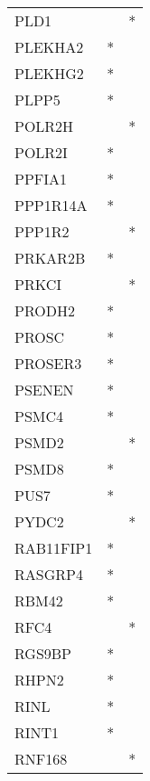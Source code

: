 \begin{longtable}{lcc}
PLD1             &                &          * \\
PLEKHA2          &              * &            \\
PLEKHG2          &              * &            \\
PLPP5            &              * &            \\
POLR2H           &                &          * \\
POLR2I           &              * &            \\
PPFIA1           &              * &            \\
PPP1R14A         &              * &            \\
PPP1R2           &                &          * \\
PRKAR2B          &              * &            \\
PRKCI            &                &          * \\
PRODH2           &              * &            \\
PROSC            &              * &            \\
PROSER3          &              * &            \\
PSENEN           &              * &            \\
PSMC4            &              * &            \\
PSMD2            &                &          * \\
PSMD8            &              * &            \\
PUS7             &              * &            \\
PYDC2            &                &          * \\
RAB11FIP1        &              * &            \\
RASGRP4          &              * &            \\
RBM42            &              * &            \\
RFC4             &                &          * \\
RGS9BP           &              * &            \\
RHPN2            &              * &            \\
RINL             &              * &            \\
RINT1            &              * &            \\
RNF168           &                &          * \\

\end{longtable}
